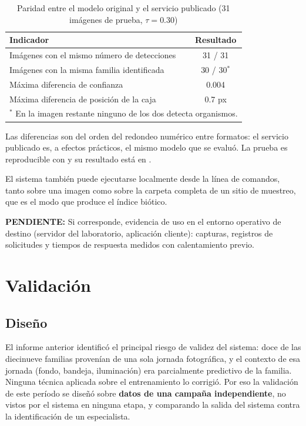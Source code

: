 \documentclass[onecolumn]{article}
\newcommand{\pendiente}[1]{\colorbox{yellow!40}{\parbox{0.95\linewidth}{\small\textbf{PENDIENTE:} #1}}}
\begin{document}
\begin{table}[H]
\centering
\renewcommand{\arraystretch}{1.15}
\caption{Paridad entre el modelo original y el servicio publicado (31 imágenes de prueba, $\tau=0.30$)}
\label{tab:paridad}
\begin{tabular}{lc}
\hline
\textbf{Indicador} & \textbf{Resultado} \\
\hline
Imágenes con el mismo número de detecciones & 31 / 31 \\
Imágenes con la misma familia identificada & 30 / 30$^{*}$ \\
Máxima diferencia de confianza & 0.004 \\
Máxima diferencia de posición de la caja & 0.7 px \\
\hline
\multicolumn{2}{l}{\footnotesize $^{*}$ En la imagen restante ninguno de los dos detecta organismos.}
\end{tabular}
\end{table}

Las diferencias son del orden del redondeo numérico entre formatos: el servicio publicado es, a efectos prácticos, el mismo modelo que se evaluó. La prueba es reproducible con  y su resultado está en .

El sistema también puede ejecutarse localmente desde la línea de comandos, tanto sobre una imagen como sobre la carpeta completa de un sitio de muestreo, que es el modo que produce el índice biótico.

\pendiente{Si corresponde, evidencia de uso en el entorno operativo de destino (servidor del laboratorio, aplicación cliente): capturas, registros de solicitudes y tiempos de respuesta medidos con calentamiento previo.}

\section{Validación}

\subsection{Diseño}

El informe anterior identificó el principal riesgo de validez del sistema: doce de las diecinueve familias provenían de una sola jornada fotográfica, y el contexto de esa jornada (fondo, bandeja, iluminación) era parcialmente predictivo de la familia. Ninguna técnica aplicada sobre el entrenamiento lo corrigió. Por eso la validación de este período se diseñó sobre \textbf{datos de una campaña independiente}, no vistos por el sistema en ninguna etapa, y comparando la salida del sistema contra la identificación de un especialista.
\end{document}
